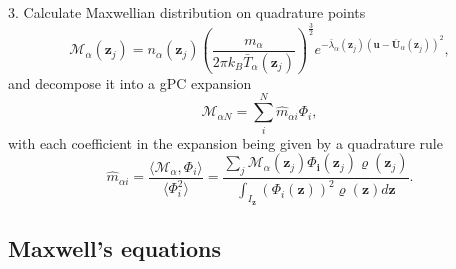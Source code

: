 \documentclass[preprint,3p,12pt,sort&compress]{elsarticle}
\begin{document}
3. Calculate Maxwellian distribution on quadrature points
\begin{equation}
\mathcal M_\alpha(\mathbf z_j)=n_{\alpha}(\mathbf z_j) \left( \frac{m_\alpha}{2\pi k_B \bar{T}_\alpha(\mathbf z_j)} \right)^{\frac{3}{2}} e^{-\bar \lambda_\alpha(\mathbf z_j)(\mathbf u-\bar{\mathbf U}_\alpha(\mathbf z_j))^2},
\end{equation}
and decompose it into a gPC expansion
\begin{equation}
\mathcal M_{\alpha N} = \sum_{i}^ N \hat m_{\alpha i} \Phi_ i,
\end{equation}
with each coefficient in the expansion being given by a quadrature rule
\begin{equation}
\hat m_{\alpha i} = \frac{\langle \mathcal M_{\alpha},\Phi_ i \rangle}{\langle \Phi_{ i}^2 \rangle} = \frac{\sum_j \mathcal M_\alpha(\mathbf z_j) \Phi_{\mathbf i}(\mathbf z_j) \varrho(\mathbf z_j)}{\int_{I_{\mathbf z}}  ( \Phi_{ i}(\mathbf z) )^2 \varrho(\mathbf z) d \mathbf z}.
\end{equation}

\subsection{Maxwell's equations}
\end{document}

